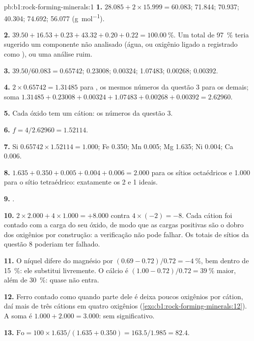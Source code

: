 \begin{solution}{pb:b1:rock-forming-minerals:1}
\textbf{1.}  $28.085 + 2\times15.999 = 60.083$;  71.844;
 70.937;  40.304;  74.692;  56.077
(\si{g.mol^{-1}}).

\textbf{2.} $39.50 + 16.53 + 0.23 + 43.32 + 0.20 + 0.22 =
\qty{100.00}{\percent}$. Um total de \qty{97}{\percent} teria sugerido um componente não analisado (água, ou oxigênio ligado a  registrado como ), ou uma análise ruim.

\textbf{3.}  $39.50/60.083 = 0.65742$;  0.23008; 
0.00324;  1.07483;  0.00268;  0.00392.

\textbf{4.} $2\times0.65742 = 1.31485$ para , os mesmos números da
questão 3 para os demais; soma $1.31485 + 0.23008 + 0.00324 + 1.07483 +
0.00268 + 0.00392 = 2.62960$.

\textbf{5.} Cada óxido tem um cátion: os números da questão 3.

\textbf{6.} $f = 4/2.62960 = 1.52114$.

\textbf{7.} Si $0.65742\times1.52114 = 1.000$; Fe 0.350; Mn 0.005; Mg 1.635;
Ni 0.004; Ca 0.006.

\textbf{8.} $1.635 + 0.350 + 0.005 + 0.004 + 0.006 = 2.000$ para os
sítios octaédricos e 1.000 para o sítio tetraédrico: exatamente os 2 e 1 ideais.

\textbf{9.} .

\textbf{10.} $2\times2.000 + 4\times1.000 = +8.000$ contra $4\times(-2) =
-8$. Cada cátion foi contado com a carga do seu óxido, de modo que as cargas positivas são o dobro dos oxigênios por construção: a verificação não pode falhar. Os totais de sítios da questão 8 poderiam ter falhado.

\textbf{11.} O níquel difere do magnésio por
$(0.69 - 0.72)/0.72 = -\qty{4}{\percent}$, bem dentro de \qty{15}{\percent}:
ele substitui livremente. O cálcio é $(1.00 - 0.72)/0.72 = \qty{39}{\percent}$
maior, além de \qty{30}{\percent}: quase não entra.

\textbf{12.} Ferro contado como  quando parte dele é  deixa
poucos oxigênios por cátion, daí mais de três cátions em quatro oxigênios
(\cref{exo:b1:rock-forming-minerals:12}). A soma é $1.000 + 2.000 = 3.000$: sem  significativo.

\textbf{13.} $\mathrm{Fo} = 100\times1.635/(1.635 + 0.350) = 163.5/1.985 =
82.4$.


\end{solution}
